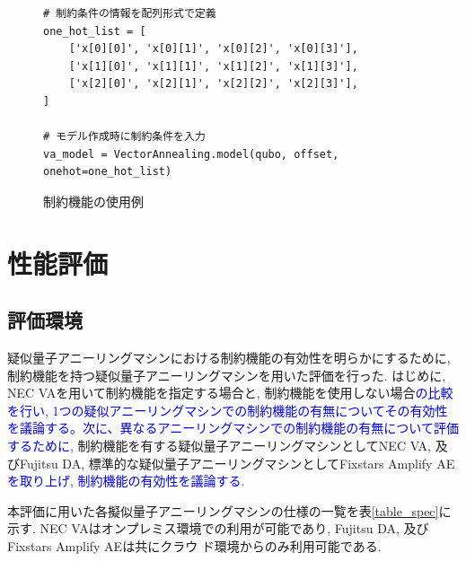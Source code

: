\documentclass[submit,techrep,noauthor]{ipsj}
\newcounter{sourcecodefigure}
\newcounter{normalfigure}
\newcommand{\switchtosourcecode}{%
    \setcounter{normalfigure}{\value{figure}}
    \setcounter{figure}{\value{sourcecodefigure}}
}
\newcommand{\switchtonormal}{%
    \setcounter{sourcecodefigure}{\value{figure}}
    \setcounter{figure}{\value{normalfigure}}
}
\newcommand\sourcecodeposition{h}
\newenvironment{sourcecode}[1][h]{%
    \begin{figure}[#1]
    \renewcommand\sourcecodeposition{#1}
    \centering
    \captionsetup{name=ソースコード}
    \switchtosourcecode
    \ifthenelse{\equal{\sourcecodeposition}{t}}%
        {\vspace{-1.3zh}} %
        {\ifthenelse{\equal{\sourcecodeposition}{b}}%
            {\vspace{-2zh}} %
            {\vspace{-2zh}} %
    }
}{%
    \ifthenelse{\equal{\sourcecodeposition}{t}}%
        {\vspace{-1.3zh}} %
        {\ifthenelse{\equal{\sourcecodeposition}{b}}%
            {\vspace{-1zh}} %
            {\vspace{-3zh}} %
    }
    \switchtonormal
    \end{figure}
}
\begin{document}
\begin{sourcecode}[tb] %
\caption{制約機能の使用例}\label{code:nec_va}
\begin{lstlisting}
# 制約条件の情報を配列形式で定義
one_hot_list = [
    ['x[0][0]', 'x[0][1]', 'x[0][2]', 'x[0][3]'],
    ['x[1][0]', 'x[1][1]', 'x[1][2]', 'x[1][3]'],
    ['x[2][0]', 'x[2][1]', 'x[2][2]', 'x[2][3]'],
]

# モデル作成時に制約条件を入力
va_model = VectorAnnealing.model(qubo, offset, onehot=one_hot_list)
\end{lstlisting}
\vspace{5mm}
\end{sourcecode}

\section{性能評価}

\subsection{評価環境}
疑似量子アニーリングマシンにおける制約機能の有効性を明らかにするために, 制約機能を持つ疑似量子アニーリングマシンを用いた評価を行った. はじめに, NEC VAを用いて制約機能を指定する場合と, 制約機能を使用しない場合\textcolor{blue}{の比較を行い, 1つの疑似アニーリングマシンでの制約機能の有無についてその有効性を議論する。次に、異なるアニーリングマシンでの制約機能の有無について評価するために, }制約機能を有する疑似量子アニーリングマシンとしてNEC VA, 及びFujitsu DA, 標準的な疑似量子アニーリングマシンとしてFixstars Amplify AE\textcolor{blue}{を取り上げ, 制約機能の有効性を議論する.}

本評価に用いた各擬似量子アニーリングマシンの仕様の一覧を表\ref{table_spec}に示す. NEC VAはオンプレミス環境での利用が可能であり, Fujitsu DA, 及びFixstars Amplify AEは共にクラウ
ド環境からのみ利用可能である.

\end{document}
